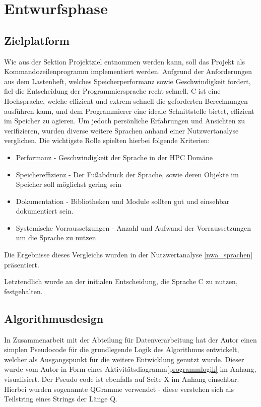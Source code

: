 \section{Entwurfsphase}


\subsection{Zielplatform}
Wie aus der Sektion Projektziel entnommen werden kann, soll das Projekt als Kommandozeilenprogramm
implementiert werden. Aufgrund der Anforderungen aus dem Lastenheft, welches Speicherperformanz sowie Geschwindigkeit fordert,
fiel die Entscheidung der Programmiersprache recht schnell. C ist eine Hochsprache, welche effizient und extrem schnell
die geforderten Berechnungen ausführen kann, und dem Programmierer eine ideale Schnittstelle bietet, effizient im Speicher zu agieren.
Um jedoch persönliche Erfahrungen und Ansichten zu verifizieren, wurden diverse weitere Sprachen anhand einer
Nutzwertanalyse verglichen. Die wichtigste Rolle spielten hierbei folgende Kriterien:
\begin{itemize}
    \item Performanz - Geschwindigkeit der Sprache in der HPC Domäne
    \item Speichereffizienz - Der Fußabdruck der Sprache, sowie deren Objekte im Speicher soll möglichst gering sein
    \item Dokumentation - Bibliotheken und Module sollten gut und einsehbar dokumentiert sein.
    \item Systemische Vorraussetzungen - Anzahl und Aufwand der Vorraussetzungen um die Sprache zu nutzen
\end{itemize}

Die Ergebnisse dieses Vergleichs wurden in der Nutzwertanalyse \ref{nwa_sprachen} präsentiert.\par
Letztendlich wurde an der initialen Entscheidung, die Sprache C zu nutzen, festgehalten.

\subsection{Algorithmusdesign}
In Zusammenarbeit mit der Abteilung für Datenverarbeitung hat der Autor einen simplen
Pseudocode für die grundlegende Logik des Algorithmus entwickelt, welcher als Ausgangspunkt
für die weitere Entwicklung genutzt wurde. Dieser wurde vom Autor in Form eines
Aktivitätsdiagramm\ref{programmlogik} im Anhang, visualisiert.
Der Pseudo code ist ebenfalls auf Seite X im Anhang einsehbar.
Hierbei wurden sogenannte QGramme verwendet - diese verstehen sich als
Teilstring eines Strings der Länge Q.



